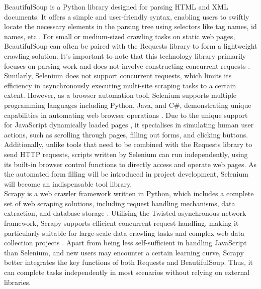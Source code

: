 \documentclass[ oneside,%
                    author={Cassie Qing Tang},
                    degree={BSc},
                     title={An Automated Response System for Disrupting Online Pet Scamming \\ },
                    subtitle={ }]{dissertation}
\begin{document}
BeautifulSoup is a Python library designed for parsing HTML and XML documents. It offers a simple and user-friendly syntax, enabling users to swiftly locate the necessary elements in the parsing tree using selectors like tag names, id names, etc \cite{chandra_python_2015}. For small or medium-sized crawling tasks on static web pages, BeautifulSoup can often be paired with the Requests library to form a lightweight crawling solution. It's important to note that this technology library primarily focuses on parsing work and does not involve constructing concurrent requests \cite{fariha_beautifulsoup_2023}.
\\

Similarly, Selenium does not support concurrent requests, which limits its efficiency in asynchronously executing multi-site scraping tasks to a certain extent. However, as a browser automation tool, Selenium supports multiple programming languages including Python, Java, and C\#, demonstrating unique capabilities in automating web browser operations \cite{fariha_beautifulsoup_2023}. Due to the unique support for JavaScript dynamically loaded pages \cite{fariha_beautifulsoup_2023}, it specialises in simulating human user actions, such as scrolling through pages, filling out forms, and clicking buttons. Additionally, unlike tools that need to be combined with the Requests library to send HTTP requests, scripts written by Selenium can run independently, using its built-in browser control functions to directly access and operate web pages. As the automated form filling will be introduced in project development, Selenium will become an indispensable tool library.
\\

Scrapy is a web crawler framework written in Python, which includes a complete set of web scraping solutions, including request handling mechanisms, data extraction, and database storage \cite{noauthor_intro_nodate}. Utilising the Twisted asynchronous network framework, Scrapy supports efficient concurrent request handling, making it particularly suitable for large-scale data crawling tasks and complex web data collection projects \cite{noauthor_intro_nodate}. Apart from being less self-sufficient in handling JavaScript than Selenium, and new users may encounter a certain learning curve, Scrapy better integrates the key functions of both Requests and BeautifulSoup. Thus, it can complete tasks independently in most scenarios without relying on external libraries.
\\
\end{document}
